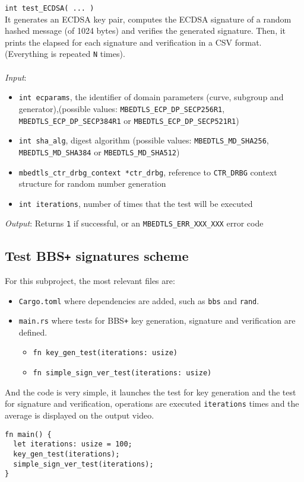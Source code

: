 \noindent
\texttt{int test\_ECDSA( ... )}\\
It generates an ECDSA key pair, computes the ECDSA signature of a random hashed message (of 1024 bytes) and verifies the generated signature. Then, it prints the elapsed for each signature and verification in a CSV format. (Everything is repeated \texttt{N} times). \\ \\
\textit{Input}:
\begin{itemize}[noitemsep,nolistsep]
  \item \texttt{int ecparams}, the identifier of domain parameters (curve, subgroup and generator),(possible values: \texttt{MBEDTLS\_ECP\_DP\_SECP256R1}, \texttt{MBEDTLS\_ECP\_DP\_SECP384R1} or \texttt{MBEDTLS\_ECP\_DP\_SECP521R1})
  \item \texttt{int sha\_alg}, digest algorithm (possible values: \texttt{MBEDTLS\_MD\_SHA256}, \texttt{MBEDTLS\_MD\_SHA384} or \texttt{MBEDTLS\_MD\_SHA512})
  \item \texttt{mbedtls\_ctr\_drbg\_context *ctr\_drbg}, reference to \texttt{CTR\_DRBG} context structure for random number generation
  \item \texttt{int iterations}, number of times that the test will be executed
\end{itemize}
\textit{Output}:  Returns \texttt{1} if successful, or an \texttt{MBEDTLS\_ERR\_XXX\_XXX} error code


\subsection{Test BBS\texttt{+} signatures scheme}
For this subproject, the most relevant files are:
\begin{itemize}
  \item \texttt{Cargo.toml} where dependencies are added, such as  
  \texttt{bbs} and \texttt{rand}. 
  \item \texttt{main.rs} where tests for BBS\texttt{+} key generation, signature and verification are defined. 
  \begin{itemize} 
    \item \texttt{fn key\_gen\_test(iterations: usize)}
    \item \texttt{fn simple\_sign\_ver\_test(iterations: usize)}
  \end{itemize}
\end{itemize}
And the code is very simple, it launches the test for key generation and the test for signature and verification, operations are executed \texttt{iterations} times and the average is displayed on the output video. 
\begin{lstlisting}[frame=single]
fn main() {
  let iterations: usize = 100;
  key_gen_test(iterations);
  simple_sign_ver_test(iterations);
}
\end{lstlisting}


